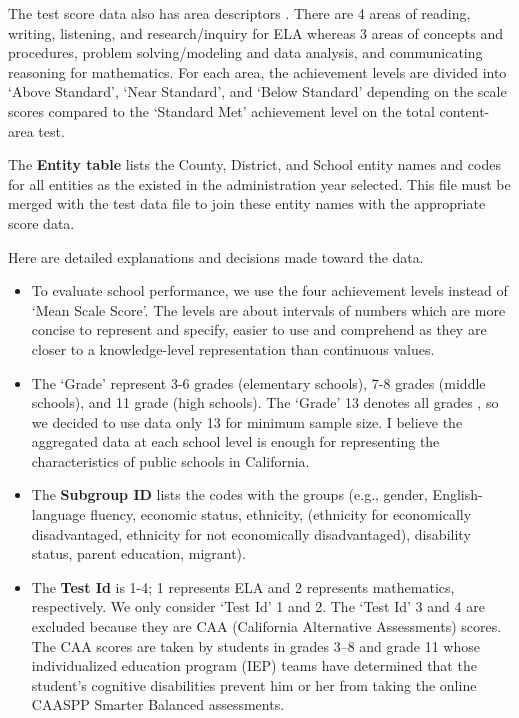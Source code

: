 \documentclass[11pt]{article}
\begin{document}
The test score data also has area descriptors \cite{CAASPP_understanding}. There are 4 areas of reading, writing, listening, and research/inquiry for ELA whereas 3 areas of concepts and procedures, problem solving/modeling and data analysis, and communicating reasoning for mathematics. For each area, the achievement levels are divided into ‘Above Standard’, ‘Near Standard’, and ‘Below Standard’ depending on the scale scores compared to the ‘Standard Met’ achievement level on the total content-area test.

The \textbf{Entity table} lists the County, District, and School entity names and codes for all entities as the existed in the administration year selected. This file must be merged with the test data file to join these entity names with the appropriate score data.

Here are detailed explanations and decisions made toward the data.

\begin{itemize}
\item
To evaluate school performance, we use the four achievement levels instead of ‘Mean Scale Score’. The levels are about intervals of numbers which are more concise to represent and specify, easier to use and comprehend as they are closer to a knowledge-level representation than continuous values. 
\item
The ‘Grade’ represent 3-6 grades (elementary schools), 7-8 grades (middle schools), and 11 grade (high schools). The ‘Grade’ 13 denotes all grades \cite{CAASPP_Research}, so we decided to use data only 13 for minimum sample size. I believe the aggregated data at each school level is enough for representing the characteristics of public schools in California.
\item
The \textbf{Subgroup ID} lists the codes with the groups (e.g., gender, English-language fluency, economic status, ethnicity, (ethnicity for economically disadvantaged, ethnicity for not economically disadvantaged), disability status, parent education, migrant). 
\item
The \textbf{Test Id} is 1-4; 1 represents ELA and 2 represents mathematics, respectively. We only consider ‘Test Id’ 1 and 2. The ‘Test Id’ 3 and 4 are excluded because they are CAA (California Alternative Assessments) scores. The CAA scores are taken by students in grades 3–8 and grade 11 whose individualized education program (IEP) teams have determined that the student's cognitive disabilities prevent him or her from taking the online CAASPP Smarter Balanced assessments.
\end{itemize}
\end{document}
